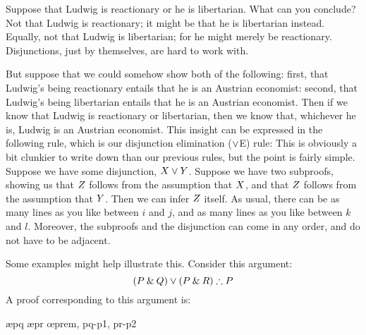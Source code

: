 Suppose that  Ludwig is reactionary or he is libertarian. What can you conclude? Not that Ludwig is reactionary; it might be that he is libertarian instead. Equally, not that Ludwig is libertarian; for he might merely be reactionary. Disjunctions, just by themselves, are hard to work with. 

But suppose that we could somehow show both of the following: first, that Ludwig's being reactionary entails that he is an Austrian economist: second, that Ludwig's being libertarian entails that he is an Austrian economist. Then if we know that Ludwig is reactionary or libertarian, then we know that, whichever he is, Ludwig is an Austrian economist. This insight can be expressed in the following rule, which is our disjunction elimination ($\vee$E) rule:
This is obviously a bit clunkier to write down than our previous rules, but the point is fairly simple. Suppose we have some disjunction, $X \vee Y$. Suppose we have two 
subproofs, 
showing us that $Z$ follows from 
the assumption that 
$X$, and that $Z$ follows from 
the assumption that 
$Y$. Then we can infer $Z$ itself. As usual, there can be as many lines as you like between
$i$ and $j$, and as many lines as you like between $k$ and $l$. 
Moreover, 
the subproofs and the disjunction 
can come in any order, and do not have to be adjacent.

Some examples might help illustrate this. Consider this argument:
$$(P \eand Q) \eor (P \eand R) \therefore P$$
A proof corresponding to this argument is:
	\begin{pf}
			\open
				\ae{pq}
			\close
			\open
				\ae{pr}
			\close
		\oe{prem, pq-p1, pr-p2}
	\end{pf}
	
	
	
